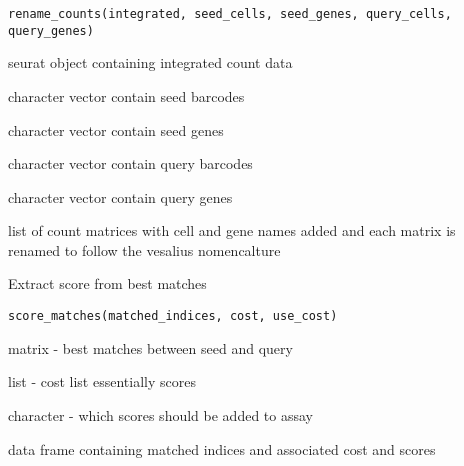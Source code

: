 \documentclass[a4paper]{book}
\begin{document}
%
\begin{Usage}
\begin{verbatim}
rename_counts(integrated, seed_cells, seed_genes, query_cells, query_genes)
\end{verbatim}
\end{Usage}
%
\begin{Arguments}
\begin{ldescription}
\item[\code{integrated}] seurat object containing integrated count data

\item[\code{seed\_cells}] character vector contain seed barcodes

\item[\code{seed\_genes}] character vector contain seed genes

\item[\code{query\_cells}] character vector contain query barcodes

\item[\code{query\_genes}] character vector contain query genes
\end{ldescription}
\end{Arguments}
%
\begin{Value}
list of count matrices with cell and gene names added and 
each matrix is renamed to follow the vesalius nomencalture
\end{Value}
%
\begin{Description}
Extract score from best matches
\end{Description}
%
\begin{Usage}
\begin{verbatim}
score_matches(matched_indices, cost, use_cost)
\end{verbatim}
\end{Usage}
%
\begin{Arguments}
\begin{ldescription}
\item[\code{matched\_indices}] matrix - best matches between seed and query

\item[\code{cost}] list - cost list essentially scores

\item[\code{use\_cost}] character - which scores should be added to assay
\end{ldescription}
\end{Arguments}
%
\begin{Value}
data frame containing matched indices and associated cost and scores
\end{Value}
\end{document}
